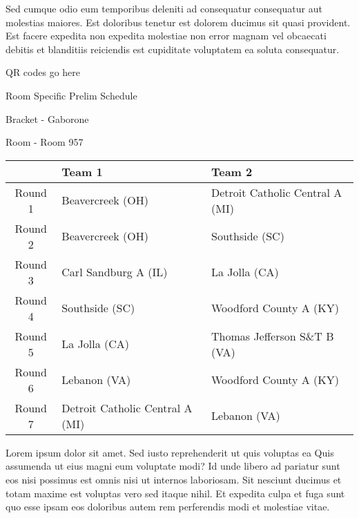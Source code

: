 \documentclass{article}%
\begin{document}
\newline%
Sed cumque odio eum temporibus deleniti ad consequatur consequatur aut molestias maiores. Est doloribus tenetur est dolorem ducimus sit quasi provident. Est facere expedita non expedita molestiae non error magnam vel obcaecati debitis et blanditiis reiciendis est cupiditate voluptatem ea soluta consequatur.%
\vspace*{140pt}%
\begin{center}%
\begin{Huge}%
QR codes go here%
\end{Huge}%
\end{center}%
\newpage%
\begin{center}%
\begin{Huge}%
Room Specific Prelim Schedule%
\end{Huge}%
\vspace*{8pt}%
\linebreak%
\begin{Large}%
Bracket {-} Gaborone%
\end{Large}%
\vspace*{8pt}%
\linebreak%
\vspace*{8pt}%
\begin{Large}%
Room {-} Room 957%
\end{Large}%
\end{center}%
%
\begin{tabularx}{\textwidth}{|c|Y|Y|}%
\hline%
&Team 1&Team 2\\%
\hline%
Round 1&Beavercreek (OH)&Detroit Catholic Central A (MI)\\%
Round 2&Beavercreek (OH)&Southside (SC)\\%
Round 3&Carl Sandburg A (IL)&La Jolla (CA)\\%
Round 4&Southside (SC)&Woodford County A (KY)\\%
Round 5&La Jolla (CA)&Thomas Jefferson S\&T B (VA)\\%
Round 6&Lebanon (VA)&Woodford County A (KY)\\%
Round 7&Detroit Catholic Central A (MI)&Lebanon (VA)\\%
\hline%
\end{tabularx}%
\vspace*{8pt}%
\newline%
Lorem ipsum dolor sit amet. Sed iusto reprehenderit ut quis voluptas ea Quis assumenda ut eius magni eum voluptate modi? Id unde libero ad pariatur sunt eos nisi possimus est omnis nisi ut internos laboriosam. Sit nesciunt ducimus et totam maxime est voluptas vero sed itaque nihil. Et expedita culpa et fuga sunt quo esse ipsam eos doloribus autem rem perferendis modi et molestiae vitae.\newline%
\end{document}
